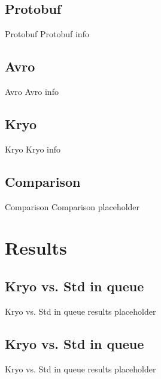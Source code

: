 \documentclass[8pt]{beamer}
\begin{document}
\renewcommand{\partname}{Protobuf}
\subsection{\partname}
\begin{frame}{\partname}
Protobuf info
\end{frame}

\renewcommand{\partname}{Avro}
\subsection{\partname}
\begin{frame}{\partname}
Avro info
\end{frame}

\renewcommand{\partname}{Kryo}
\subsection{\partname}
\begin{frame}{\partname}
Kryo info
\end{frame}

\renewcommand{\partname}{Comparison}
\subsection{\partname}
\begin{frame}{\partname}
Comparison placeholder
\end{frame}

\section{Results}
\renewcommand{\partname}{Kryo vs. Std in queue}
\subsection{\partname}
\begin{frame}{\partname}
results placeholder
\end{frame}

\renewcommand{\partname}{Kryo vs. Std in queue}
\subsection{\partname}
\begin{frame}{\partname}
results placeholder
\end{frame}
\end{document}

